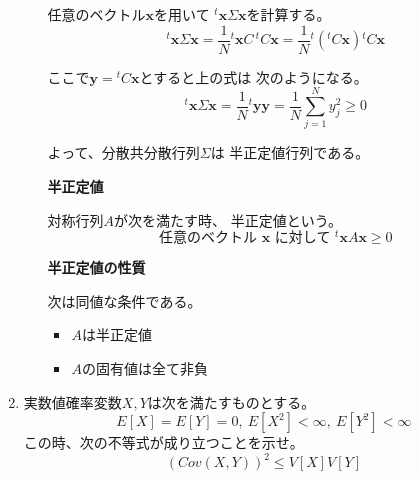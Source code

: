 \documentclass[12pt,b5paper]{ltjsarticle}
\begin{document}
\begin{enumerate}
\begin{enumerate}
            任意のベクトル$\bm{x}$を用いて
            ${}^{t}\!\bm{x}\Sigma \bm{x}$を計算する。
            \begin{equation}
             {}^{t}\!\bm{x}\Sigma \bm{x}
              = \frac{1}{N} {}^{t}\!\bm{x} C\, {}^{t}\!C \bm{x}
              = \frac{1}{N} {}^{t}({}^{t}\!C\bm{x}) {}^{t}\!C \bm{x}
            \end{equation}

            ここで$\bm{y}={}^{t}\!C\bm{x}$とすると上の式は
            次のようになる。
            \begin{equation}
             {}^{t}\!\bm{x}\Sigma \bm{x}
              = \frac{1}{N} {}^{t}\!\bm{y} \bm{y}
              = \frac{1}{N} \sum_{j=1}^{N}y_j^2 \geq 0
            \end{equation}

            よって、分散共分散行列$\Sigma$は
            半正定値行列である。

\dotfill

            \textbf{半正定値}

            対称行列$A$が次を満たす時、
            半正定値という。
            \begin{equation}
             \text{任意のベクトル }\bm{x}
              \text{ に対して }
              {}^{t}\!\bm{x}A\bm{x} \geq 0
            \end{equation}

            \textbf{半正定値の性質}

            次は同値な条件である。
            \begin{itemize}
             \item $A$は半正定値
             \item $A$の固有値は全て非負
            \end{itemize}

\hrulefill

      \end{enumerate}

 \item
      実数値確率変数$X,Y$は次を満たすものとする。
      \begin{equation}
       E[X]=E[Y]=0,\ E[X^2]<\infty,\ E[Y^2]<\infty
      \end{equation}
      この時、次の不等式が成り立つことを示せ。
      \begin{equation}
       (Cov(X,Y))^2 \leq V[X]V[Y]
      \end{equation}

\dotfill


\end{enumerate}
\end{document}
